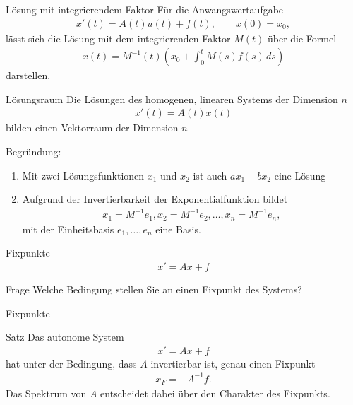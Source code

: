 \documentclass[notheorems,hidelinks,aspectratio=1610]{beamer}
\begin{document}
\begin{frame}
  \begin{block}{Lösung mit integrierendem Faktor}
    Für die Anwangswertaufgabe
    \begin{gather*}
      x'(t) = A(t)u(t)+ f(t),
      \qquad
      x(0) = x_0,
    \end{gather*}
    lässt sich die Lösung mit dem integrierenden Faktor $M(t)$ über die Formel
    \begin{gather*}
      x(t) = M^{-1}(t)
      \left(
        x_0 + \int_0^t M(s) f(s) \,ds
      \right)
    \end{gather*}
    darstellen.
  \end{block}
\end{frame}

\begin{frame}
  \begin{block}{Lösungsraum}
    Die Lösungen des homogenen, linearen Systems der Dimension $n$
    \begin{gather*}
      x'(t) = A(t)x(t)
    \end{gather*}
    bilden einen Vektorraum der Dimension $n$
  \end{block}
  \pause
  Begründung:
  \begin{enumerate}
  \item Mit zwei Lösungsfunktionen $x_1$ und $x_2$ ist auch
    $ax_1+bx_2$ eine Lösung
  \item Aufgrund der Invertierbarkeit der Exponentialfunktion bildet
    \begin{gather*}
      x_1 = M^{-1} e_1, x_2 = M^{-1} e_2,\dots, x_n = M^{-1} e_n,
    \end{gather*}
    mit der Einheitsbasis $e_1,\dots,e_n$ eine Basis.
  \end{enumerate}
\end{frame}

\begin{frame}{Fixpunkte}
  \begin{gather*}
    x' = Ax+f
  \end{gather*}
  \begin{exampleblock}{Frage}
    Welche Bedingung stellen Sie an einen Fixpunkt des Systems?
  \end{exampleblock}
\end{frame}


\begin{frame}{Fixpunkte}
  \begin{block}{Satz}
  Das autonome System
  \begin{gather*}
    x' = Ax+f
  \end{gather*}
  hat unter der Bedingung, dass $A$ invertierbar ist, genau einen Fixpunkt
  \begin{gather*}
    x_F = -A^{-1}f.
  \end{gather*}
  Das Spektrum von $A$ entscheidet dabei über den Charakter des Fixpunkts.    
  \end{block}
\end{frame}
\end{document}

